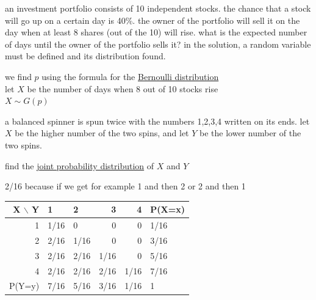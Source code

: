 \documentclass[a4paper,12pt]{article}
\begin{document}
\begin{question}
an investment portfolio consists of 10 independent stocks. the chance that a stock will go up on a certain day is 40\%. the owner of the portfolio will sell it on the day when at least 8 shares (out of the 10) will rise. what is the expected number of days until the owner of the portfolio sells it? in the solution, a random variable must be defined and its distribution found.\\
\begin{answer}
we find \(p\) using the formula for the \href{20230113174354-binomial_distribution.org}{Bernoulli distribution}\\
let \(X\) be the number of days when 8 out of 10 stocks rise\\
\(X \sim G(p)\)\\
\end{answer}
\end{question}
\begin{question}
a balanced spinner is spun twice with the numbers 1,2,3,4 written on its ends. let \(X\) be the higher number of the two spins, and let \(Y\) be the lower number of the two spins.\\
\begin{subquestion}
find the \href{20230120140031-joint_probability_distribution.org}{joint probability distribution} of \(X\) and \(Y\)\\
\begin{answer}
\begin{note}
2/16 because if we get for example 1 and then 2 or 2 and then 1\\
\end{note}
\begin{tabular}{rllrrl}
X $\backslash$ Y & 1 & 2 & 3 & 4 & P(X=x)\\
\hline
1 & 1/16 & 0 & 0 & 0 & 1/16\\
2 & 2/16 & 1/16 & 0 & 0 & 3/16\\
3 & 2/16 & 2/16 & 1/16 & 0 & 5/16\\
4 & 2/16 & 2/16 & 2/16 & 1/16 & 7/16\\
P(Y=y) & 7/16 & 5/16 & 3/16 & 1/16 & 1\\
\end{tabular}
\end{answer}
\end{subquestion}
\end{question}
\end{document}
